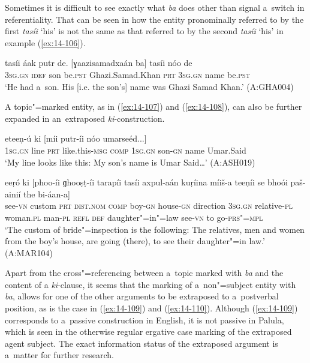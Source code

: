 Sometimes it is difficult to see exactly what \textit{ba} does other than signal a~switch in referentiality. That can be seen in how the entity pronominally referred to by the first \textit{tasíi} `his' is not the same as that referred to by the second \textit{tasíi} `his' in example (\ref{ex:14-106}).

\begin{exe}
\ex
\label{ex:14-106}
\gll tasíi áak putr de. [ɣaazisamadxaán ba]  tasíi nóo de \\
\textsc{3sg.gn} \textsc{idef} son be.\textsc{pst} Ghazi.Samad.Khan \textsc{prt}  \textsc{3sg.gn} name be.\textsc{pst} \\
\glt `He had a~son. His [i.e. the son's] name was Ghazi Samad Khan.' (A:GHA004)
\end{exe}

A topic"=marked entity, as in (\ref{ex:14-107}) and (\ref{ex:14-108}), can also be further expanded in an~extraposed \textit{ki}-construction.

\begin{exe}
\ex
\label{ex:14-107}
 eteeṇ-ú ki [míi putr-íi  nóo umarseéd...] \\
\textsc{1sg.gn} line \textsc{prt} like.this-\textsc{msg } \textsc{comp} \textsc{1sg.gn} son-\textsc{gn}  name Umar.Said \\
\glt `My line looks like this: My son's name is Umar Said{\ldots}' (A:ASH019)

\ex
\label{ex:14-108}
 eeṛó ki [phoo-íi  ɡhooṣṭ-íi tarapíi tasíi
  axpul-aán kuṛíina  míiš-a teeṇíi se bhoói paš-ainií the bi-áan-a] \\
see-\textsc{vn} custom \textsc{prt} \textsc{dist.nom} \textsc{comp} boy-\textsc{gn}  house-\textsc{gn} direction \textsc{3sg.gn} relative-\textsc{pl} woman.\textsc{pl}  man-\textsc{pl} \textsc{refl } \textsc{def} daughter"=in"=law see-\textsc{vn} to go-\textsc{prs"=mpl} \\
\glt `The custom of bride"=inspection is the following: The relatives, men and women from the boy's house, are going (there), to see their daughter"=in law.' (A:MAR104)
\end{exe}

Apart from the cross"=referencing between a~topic marked with \textit{ba} and the content of a \textit{ki}-clause, it seems that the marking of a~non"=subject entity with \textit{ba}, allows for one of the other arguments to be extraposed to a~postverbal position, as is the case in (\ref{ex:14-109}) and (\ref{ex:14-110}). Although (\ref{ex:14-109}) corresponds to a~passive construction in English, it is not passive in Palula, which is seen in the otherwise regular ergative case marking of the extraposed agent subject. The exact information status of the extraposed argument is a~matter for further research.

